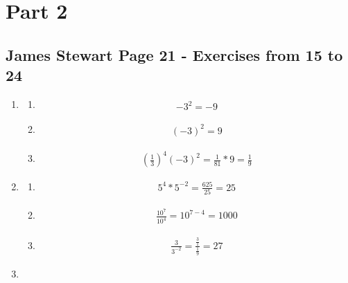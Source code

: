 \documentclass{article}
\begin{document}
\section{Part 2}
\subsection{James Stewart Page 21  -  Exercises from 15 to 24}

\begin{enumerate}
	\item
	      \begin{enumerate}
		      \item
		            \begin{align*}
			            -3^2  = -9
		            \end{align*}
		      \item
		            \begin{align*}
			            (-3)^2  = 9
		            \end{align*}
		      \item
		            \begin{align*}
			            \left(\frac{1}{3}\right)^4(-3)^2 
			             = \frac{1}{81}*9                 
			             = \frac{1}{9}
		            \end{align*}
	      \end{enumerate}
	\item
	      \begin{enumerate}
		      \item
		            \begin{align*}
			            5^4*5^{-2}
			             = \frac{625}{25}
			             = 25
		            \end{align*}
		      \item
		            \begin{align*}
			            \frac{10^7}{10^4}
			             = 10^{7-4}
			             = 1000
		            \end{align*}
		      \item
		            \begin{align*}
			            \frac{3}{3^{-2}}
			             = \frac{\frac{3}{1}}{\frac{1}{9}}
			             = 27
		            \end{align*}
	      \end{enumerate}
	\item


\end{enumerate}
\end{document}
